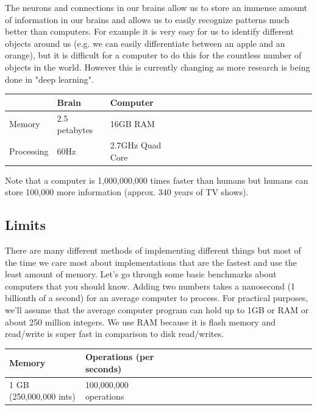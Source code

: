 \documentclass[11pt,oneside]{book}
\begin{document}
The neurons and connections in our brains allow us to store an immense amount of information in our brains and allows us to easily recognize patterns much better than computers. For example it is very easy for us to identify different objects around us (e.g. we can easily differentiate between an apple and an orange), but it is difficult for a computer to do this for the countless number of objects in the world. However this is currently changing as more research is being done in "deep learning".

\vspace{10pt} \begin{tabulary}{0.4\linewidth}{|l|l|l|l|l|l|l|l|l|l|l|l|l|l|l|l|l|l|l}\hline


   &
  Brain &
  Computer\\
\hline


  Memory &
  2.5 petabytes &
  16GB RAM\\

  Processing &
  60Hz &
  2.7GHz Quad Core\\

\hline\end{tabulary}

Note that a computer is 1,000,000,000 times faster than humans but humans can store 100,000 more information (approx. 340 years of TV shows).

\subsection{Limits}

There are many different methods of implementing different things but most of the time we care most about implementations that are the fastest and use the least amount of memory. Let's go through some basic benchmarks about computers that you should know. Adding two numbers takes a nanosecond (1 billionth of a second) for an average computer to process. For practical purposes, we'll assume that the average computer program can hold up to 1GB or RAM or about 250 million integers. We use RAM because it is flash memory and read/write is super fast in comparison to disk read/writes.

\vspace{10pt} \begin{tabulary}{0.4\linewidth}{|l|l|l|l|l|l|l|l|l|l|l|l|l|l|l|l|l|l|l}\hline


  Memory &
  Operations (per seconds)\\
\hline


  1 GB (250,000,000 ints) &
  100,000,000 operations\\

\hline\end{tabulary}
\end{document}
